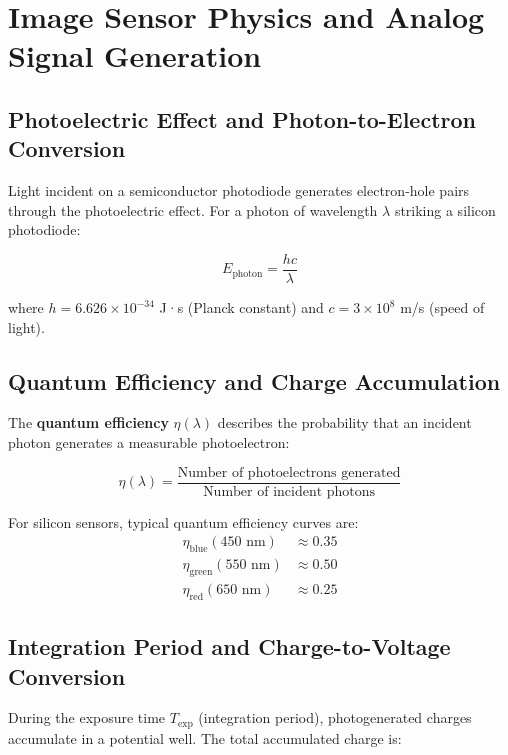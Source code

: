 \documentclass[11pt,a4paper]{article}
\begin{document}
\section{Image Sensor Physics and Analog Signal Generation}

\subsection{Photoelectric Effect and Photon-to-Electron Conversion}

Light incident on a semiconductor photodiode generates electron-hole pairs through the photoelectric effect. For a photon of wavelength $\lambda$ striking a silicon photodiode:

\begin{equation}
E_{\text{photon}} = \frac{hc}{\lambda}
\end{equation}

where $h = 6.626 \times 10^{-34}$ J·s (Planck constant) and $c = 3 \times 10^8$ m/s (speed of light).

\subsection{Quantum Efficiency and Charge Accumulation}

The \textbf{quantum efficiency} $\eta(\lambda)$ describes the probability that an incident photon generates a measurable photoelectron:

\begin{equation}
\eta(\lambda) = \frac{\text{Number of photoelectrons generated}}{\text{Number of incident photons}}
\end{equation}

For silicon sensors, typical quantum efficiency curves are:
\begin{align}
\eta_{\text{blue}}(450\text{ nm}) &\approx 0.35 \\
\eta_{\text{green}}(550\text{ nm}) &\approx 0.50 \\
\eta_{\text{red}}(650\text{ nm}) &\approx 0.25
\end{align}

\subsection{Integration Period and Charge-to-Voltage Conversion}

During the exposure time $T_{\text{exp}}$ (integration period), photogenerated charges accumulate in a potential well. The total accumulated charge is:
\end{document}
